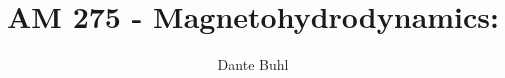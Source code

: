 \documentclass{article}
\begin{document}
\title{AM 275 - Magnetohydrodynamics:}
\author{Dante Buhl}


\newcommand{\wrms}{w_{\text{rms}}}
\newcommand{\bs}[1]{\boldsymbol{#1}}
\newcommand{\tb}[1]{\textbf{#1}}
\newcommand{\bmp}[1]{\begin{minipage}{#1\textwidth}}
\newcommand{\emp}{\end{minipage}}
\newcommand{\R}{\mathbb{R}}
\newcommand{\C}{\mathbb{C}}
\newcommand{\N}{\mathcal{N}}
\newcommand{\K}{\bs{\mathrm{K}}}
\newcommand{\m}{\bs{\mu}_*}
\newcommand{\s}{\bs{\Sigma}_*}
\newcommand{\dt}{\Delta t}
\newcommand{\dx}{\Delta x}
\newcommand{\tr}[1]{\text{Tr}(#1)}
\newcommand{\Tr}[1]{\text{Tr}(#1)}
\newcommand{\Div}{\nabla \cdot}
\renewcommand{\div}{\nabla \cdot}
\newcommand{\Curl}{\nabla \times}
\newcommand{\Grad}{\nabla}
\newcommand{\grad}{\nabla}
\newcommand{\grads}{\nabla_s}
\newcommand{\gradf}{\nabla_f}
\newcommand{\xs}{x_s}
\newcommand{\x}{\bs{x}}
\newcommand{\xf}{x_f}
\newcommand{\ts}{t_s}
\newcommand{\tf}{t_f}
\newcommand{\pt}{\partial t}
\newcommand{\pz}{\partial z}
\newcommand{\uvec}{\bs{u}}
\newcommand{\bvec}{\bs{B}}
\newcommand{\nvec}{\hat{\bs{n}}}
\newcommand{\B}{\bs{B}}
\newcommand{\A}{\bs{A}}
\newcommand{\jvec}{\bs{j}}
\newcommand{\F}{\bs{F}}
\newcommand{\T}{\tilde{T}}
\newcommand{\ez}{\bs{e}_z}
\newcommand{\ex}{\bs{e}_x}
\newcommand{\ey}{\bs{e}_y}
\newcommand{\eo}{\bs{e}_{\bs{\Omega}}}
\newcommand{\ppt}[1]{\frac{\partial #1}{\partial t}}
\newcommand{\pp}[2]{\frac{\partial #1}{\partial #2}}
\newcommand{\pptwo}[2]{\frac{\partial^2 #1}{\partial #2^2}}
\newcommand{\DDt}[1]{\frac{D #1}{D t}}
\newcommand{\ppts}[1]{\frac{\partial #1}{\partial t_s}}
\newcommand{\pptf}[1]{\frac{\partial #1}{\partial t_f}}
\newcommand{\ppz}[1]{\frac{\partial #1}{\partial z}}
\newcommand{\ddz}[1]{\frac{d #1}{d z}}
\newcommand{\ppzetas}[1]{\frac{\partial^2 #1}{\partial \zeta^2}}
\newcommand{\ppzs}[1]{\frac{\partial #1}{\partial z_s}}
\newcommand{\ppzf}[1]{\frac{\partial #1}{\partial z_f}}
\newcommand{\ppx}[1]{\frac{\partial #1}{\partial x}}
\newcommand{\ppxi}[1]{\frac{\partial #1}{\partial x_i}}
\newcommand{\ppxj}[1]{\frac{\partial #1}{\partial x_j}}
\newcommand{\ppy}[1]{\frac{\partial #1}{\partial y}}
\newcommand{\ppzeta}[1]{\frac{\partial #1}{\partial \zeta}}


\maketitle 
\setlength{\parindent}{0pt}
\end{document}
